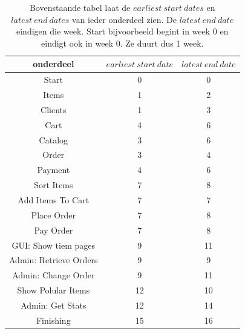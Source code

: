 \documentclass[•]{article}
\begin{document}
\begin{table}
\centering
\begin{tabular}{|c|c|c|}
\hline
onderdeel & $earliest\ start\ date$ & $latest\ end\ date$\\
\hline
Start						& 0  & 0	\\
Items						& 1  & 2	\\
Clients						& 1  & 3	\\
Cart						& 4  & 6	\\
Catalog						& 3  & 6	\\
Order						& 3  & 4	\\
Payment						& 4  & 6	\\
Sort Items					& 7  & 8	\\
Add Items To Cart			& 7  & 7	\\
Place Order					& 7  & 8	\\
Pay Order					& 7  & 8	\\
GUI: Show tiem pages		& 9  & 11	\\
Admin: Retrieve Orders		& 9  & 9	\\
Admin: Change Order			& 9  & 11	\\
Show Polular Items			& 12 & 10	\\
Admin: Get Stats			& 12 & 14	\\
Finishing					& 15 & 16	\\
\hline
\end{tabular}
\caption{Bovenstaande tabel laat de $earliest\ start\ dates$ en $latest\ end\ dates$ van ieder onderdeel zien. De $latest\ end\ date$ eindigen die week. Start bijvoorbeeld begint in week 0 en eindigt ook in week 0. Ze duurt dus 1 week.}
\label{tbl_dates}
\end{table}
\end{document}
